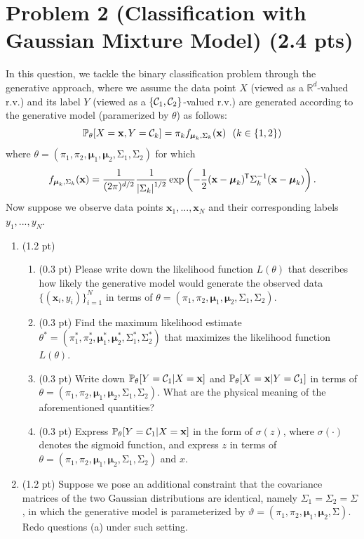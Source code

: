 \documentclass{article}
\newcommand{\real}{\mathbb{R}}
\newcommand*{\tran}{^{\mkern-1.5mu\mathsf{T}}}
\def\vecx{{\mathbf x}}
\def\vecmu{{\boldsymbol \mu}}
\def\matSigma{{\mathbf{\mathrm{\Sigma}}}}
\def\real{{\mathbb {R}}}
\def\prob{\mathbb{P}}
\def\calC{{\cal C}}
\begin{document}
\section*{Problem 2 (Classification with Gaussian Mixture Model) (2.4 pts)}

In this question, we tackle the binary classification problem through the generative approach, where we assume the data point $X$ (viewed as a $\real^d$-valued r.v.) and its label $Y$ (viewed as a $\{\calC_1,\calC_2\}$-valued r.v.) are generated according to the generative model (paramerized by $\theta$) as follows:
\begin{equation}\label{eq:two_gaussian}
\prob_\theta [X = \vecx,Y = \calC_k] = \pi_k f_{\vecmu_k,\matSigma_k}(\vecx)~~ (k \in \{1,2\})
\end{equation}
%
where $\theta = (\pi_1,\pi_2,\vecmu_1,\vecmu_2,\matSigma_1,\matSigma_2)$ for which
\begin{equation*}
f_{\vecmu_k,\matSigma_k}(\vecx) = \frac{1}{(2\pi)^{d/2}}\frac{1}{\left| \matSigma_k \right|^{1/2}}\exp\left(-\frac{1}{2}(\vecx-\vecmu_k)\tran \matSigma_k^{-1}(\vecx-\vecmu_k)\right).
\end{equation*}
%
Now suppose we observe data points $\vecx_1,...,\vecx_N$ and their corresponding labels $y_1,...,y_N$.
\begin{enumerate}[label=(\alph*)]
\item (1.2 pt)
\begin{enumerate}[label=(\roman*)]
\item (0.3 pt) Please write down the likelihood function $L(\theta)$ that describes how likely the generative model would generate the observed data $\{(\vecx_i,y_i)\}_{i=1}^N$ in terms of $\theta = (\pi_1,\pi_2,\vecmu_1,\vecmu_2,\matSigma_1,\matSigma_2)$.
%
\item (0.3 pt) Find the maximum likelihood estimate $\theta^* = (\pi^*_1,\pi^*_2,\vecmu^*_1,\vecmu^*_2,\matSigma^*_1,\matSigma^*_2)$ that maximizes the likelihood function $L(\theta)$. %
%
\item (0.3 pt) Write down $\prob_\theta[Y=\calC_1|X=\vecx]$ and $\prob_\theta[X=\vecx|Y=\calC_1]$ in terms of $\theta = (\pi_1,\pi_2,\vecmu_1,\vecmu_2,\matSigma_1,\matSigma_2)$. What are the physical meaning of the aforementioned quantities?
%
\item (0.3 pt) Express $\prob_\theta[Y=\calC_1|X=\vecx]$ in the form of $\sigma(z)$, where $\sigma(\cdot)$ denotes the sigmoid function, and express $z$ in terms of $\theta = (\pi_1,\pi_2,\vecmu_1,\vecmu_2,\matSigma_1,\matSigma_2)$ and $x$.
\end{enumerate}
%
\item (1.2 pt) Suppose we pose an additional constraint that the covariance matrices of the two Gaussian distributions are identical, namely $\Sigma_1=\Sigma_2=\Sigma$, in which the generative model is parameterized by $\vartheta = (\pi_1,\pi_2,\vecmu_1,\vecmu_2,\matSigma)$. Redo questions (a) under such setting.
\end{enumerate}
\end{document}
